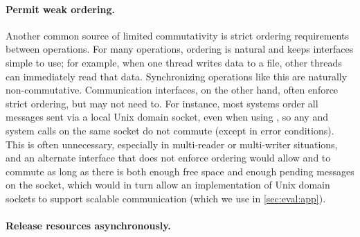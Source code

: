 \paragraph{Permit weak ordering.}

Another common source of limited commutativity is strict ordering
requirements between operations.  For many operations, ordering is
natural and keeps interfaces simple to use; for example, when one thread
writes data to a file, other threads can immediately read that data.
%
Synchronizing operations like this are naturally non-commutative.
%
Communication interfaces, on the other hand, often enforce strict
ordering, but may not need to.
For instance, most systems order all messages sent via a local Unix
domain socket, even when using
, so any  and  system
calls on the same socket do not commute (except in error conditions).
This is often unnecessary, especially in multi-reader or multi-writer
situations, and an alternate interface that does not enforce ordering
would allow  and  to commute as long as there is
both enough free space and enough pending messages on the socket, which
would in turn allow an implementation of Unix domain sockets to support
scalable communication (which we use in \cref{sec:eval:app}).


\paragraph{Release resources asynchronously.}


